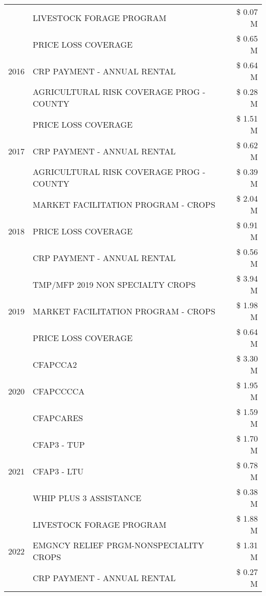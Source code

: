 \begin{tabular}{llr}
 & LIVESTOCK FORAGE PROGRAM & \$ 0.07 M \\
\cline{1-3}
\multirow[t]{3}{*}{2016} & PRICE LOSS COVERAGE & \$ 0.65 M \\
 & CRP PAYMENT - ANNUAL RENTAL & \$ 0.64 M \\
 & AGRICULTURAL RISK COVERAGE PROG - COUNTY & \$ 0.28 M \\
\cline{1-3}
\multirow[t]{3}{*}{2017} & PRICE LOSS COVERAGE & \$ 1.51 M \\
 & CRP PAYMENT - ANNUAL RENTAL & \$ 0.62 M \\
 & AGRICULTURAL RISK COVERAGE PROG - COUNTY & \$ 0.39 M \\
\cline{1-3}
\multirow[t]{3}{*}{2018} & MARKET FACILITATION PROGRAM - CROPS & \$ 2.04 M \\
 & PRICE LOSS COVERAGE & \$ 0.91 M \\
 & CRP PAYMENT - ANNUAL RENTAL & \$ 0.56 M \\
\cline{1-3}
\multirow[t]{3}{*}{2019} & TMP/MFP 2019 NON SPECIALTY CROPS & \$ 3.94 M \\
 & MARKET FACILITATION PROGRAM - CROPS & \$ 1.98 M \\
 & PRICE LOSS COVERAGE & \$ 0.64 M \\
\cline{1-3}
\multirow[t]{3}{*}{2020} & CFAPCCA2 & \$ 3.30 M \\
 & CFAPCCCCA & \$ 1.95 M \\
 & CFAPCARES & \$ 1.59 M \\
\cline{1-3}
\multirow[t]{3}{*}{2021} & CFAP3 - TUP & \$ 1.70 M \\
 & CFAP3 - LTU & \$ 0.78 M \\
 & WHIP PLUS 3 ASSISTANCE & \$ 0.38 M \\
\cline{1-3}
\multirow[t]{3}{*}{2022} & LIVESTOCK FORAGE PROGRAM & \$ 1.88 M \\
 & EMGNCY RELIEF PRGM-NONSPECIALITY CROPS & \$ 1.31 M \\
 & CRP PAYMENT - ANNUAL RENTAL & \$ 0.27 M \\
\cline{1-3}
\bottomrule
\end{tabular}
